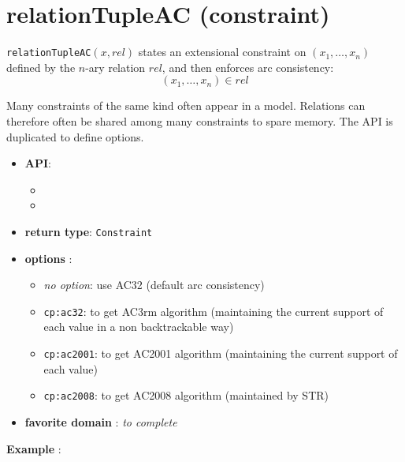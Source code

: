 \label{relationtupleac}
\hypertarget{relationtupleac}{}

\section{relationTupleAC (constraint)}\label{relationtupleac:relationtupleacconstraint}\hypertarget{relationtupleac:relationtupleacconstraint}{}
\begin{notedef}
  \texttt{relationTupleAC}$(x,rel)$ states an extensional constraint on $(x_1,\ldots,x_n)$ defined by the $n$-ary relation $rel$, and then enforces arc consistency:
$$(x_1,\ldots,x_n)\in rel$$
\end{notedef}
Many constraints of the same kind often appear in a model. Relations can therefore often be shared among many constraints to spare memory.
The API is duplicated to define options.

\begin{itemize}
	\item \textbf{API}:
	\begin{itemize}
		\item {}
		\item {}
	\end{itemize}
	\item \textbf{return type}: \texttt{Constraint}
	\item \textbf{options} :
	\begin{itemize}
		\item \emph{no option}: use AC32 (default arc consistency)
		\item \texttt{cp:ac32}: to get AC3rm algorithm (maintaining the current support of each value in a non backtrackable way)
		\item \texttt{cp:ac2001}: to get AC2001 algorithm (maintaining the current support of each value)
		\item \texttt{cp:ac2008}: to get AC2008 algorithm (maintained by STR)
	\end{itemize}
	\item \textbf{favorite domain} : \emph{to complete}
\end{itemize}

\textbf{Example} :

